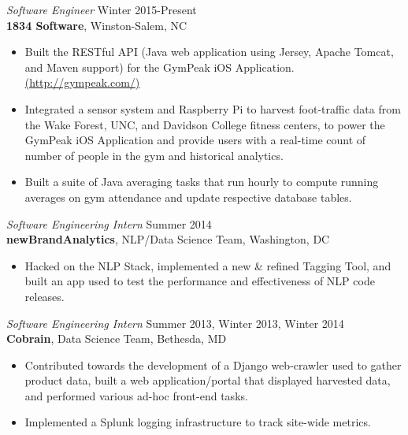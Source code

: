 \documentclass[margin]{res}
\begin{document}
\begin{resume}
{\sl Software Engineer} \hfill Winter 2015-Present \\
\textbf{1834 Software}, Winston-Salem, NC
\begin{itemize} \itemsep -2pt %
\item Built the RESTful API (Java web application using Jersey, Apache Tomcat, and Maven support) for the GymPeak iOS Application. \underline{\color{blue}\href{http://gympeak.com/}{(http://gympeak.com/)}}
\item Integrated a sensor system and Raspberry Pi to harvest foot-traffic data from the Wake Forest, UNC, and Davidson College fitness centers, to power the GymPeak iOS Application and provide users with a real-time count of number of people in the gym and historical analytics.
\item Built a suite of Java averaging tasks that run hourly to compute running averages on gym attendance and update respective database tables.
\end{itemize}

{\sl Software Engineering Intern} \hfill Summer 2014 \\
\textbf{newBrandAnalytics}, NLP/Data Science Team, Washington, DC 

\begin{itemize} \itemsep -2pt %
\item Hacked on the NLP Stack, implemented a new \& refined Tagging Tool, and built an app used to test the performance and effectiveness of NLP code releases. 
\end{itemize}
 
{\sl Software Engineering Intern} \hfill Summer 2013, Winter 2013, Winter 2014 \\
\textbf{Cobrain}, Data Science Team, Bethesda, MD 
\begin{itemize} 
\item Contributed towards the development of a Django web-crawler used to gather product data, built a web application/portal that displayed harvested data, and performed various ad-hoc front-end tasks.
\item Implemented a Splunk logging infrastructure to track site-wide metrics. \\
\end{itemize} 



\end{resume}
\end{document}
